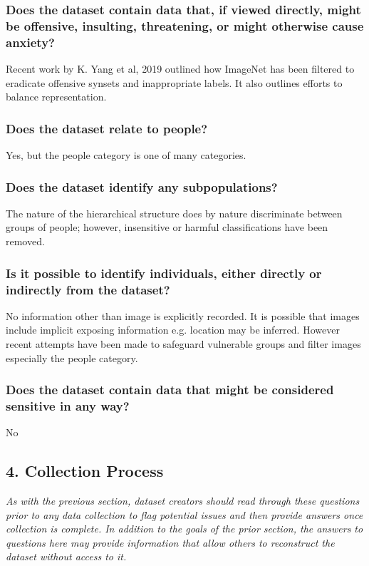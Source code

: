 \documentclass[a4paper,12pt]{article}
\begin{document}
\subsubsection*{Does the dataset contain data that, if viewed directly, might be offensive, insulting, threatening,
  or might otherwise cause anxiety?}

Recent work by K. Yang et al, 2019 outlined how ImageNet has been filtered to eradicate offensive
synsets and inappropriate labels. It also outlines efforts to balance representation.

\subsubsection*{Does the dataset relate to people?}

Yes, but the people category is one of many categories.

\subsubsection*{Does the dataset identify any subpopulations?}

The nature of the hierarchical structure does by nature discriminate between groups of people;
however, insensitive or harmful classifications have been removed.

\subsubsection*{Is it possible to identify individuals, either directly or indirectly from the dataset?}

No information other than image is explicitly recorded. It is possible that images include implicit
exposing information e.g. location may be inferred. However recent attempts have been made to
safeguard vulnerable groups and filter images especially the people category.

\subsubsection*{Does the dataset contain data that might be considered sensitive in any way?}

No

\subsection*{4. Collection Process}

\textit{As with the previous section, dataset creators should
read through these questions prior to any data collection to flag potential issues
and then provide answers once collection is complete. In addition to the goals
of the prior section, the answers to questions here may provide information that
allow others to reconstruct the dataset without access to it.}
\end{document}

